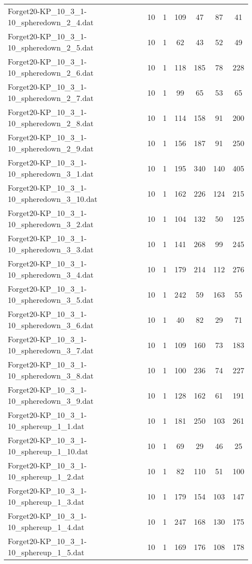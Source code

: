 \begin{table}[!ht]
\begin{tabular}{lcccccc}
Forget20-KP\_10\_3\_1-10\_spheredown\_2\_4.dat & 10 & 1 & 109 & 47 & 87 & 41 \\
Forget20-KP\_10\_3\_1-10\_spheredown\_2\_5.dat & 10 & 1 & 62 & 43 & 52 & 49 \\
Forget20-KP\_10\_3\_1-10\_spheredown\_2\_6.dat & 10 & 1 & 118 & 185 & 78 & 228 \\
Forget20-KP\_10\_3\_1-10\_spheredown\_2\_7.dat & 10 & 1 & 99 & 65 & 53 & 65 \\
Forget20-KP\_10\_3\_1-10\_spheredown\_2\_8.dat & 10 & 1 & 114 & 158 & 91 & 200 \\
Forget20-KP\_10\_3\_1-10\_spheredown\_2\_9.dat & 10 & 1 & 156 & 187 & 91 & 250 \\
Forget20-KP\_10\_3\_1-10\_spheredown\_3\_1.dat & 10 & 1 & 195 & 340 & 140 & 405 \\
Forget20-KP\_10\_3\_1-10\_spheredown\_3\_10.dat & 10 & 1 & 162 & 226 & 124 & 215 \\
Forget20-KP\_10\_3\_1-10\_spheredown\_3\_2.dat & 10 & 1 & 104 & 132 & 50 & 125 \\
Forget20-KP\_10\_3\_1-10\_spheredown\_3\_3.dat & 10 & 1 & 141 & 268 & 99 & 245 \\
Forget20-KP\_10\_3\_1-10\_spheredown\_3\_4.dat & 10 & 1 & 179 & 214 & 112 & 276 \\
Forget20-KP\_10\_3\_1-10\_spheredown\_3\_5.dat & 10 & 1 & 242 & 59 & 163 & 55 \\
Forget20-KP\_10\_3\_1-10\_spheredown\_3\_6.dat & 10 & 1 & 40 & 82 & 29 & 71 \\
Forget20-KP\_10\_3\_1-10\_spheredown\_3\_7.dat & 10 & 1 & 109 & 160 & 73 & 183 \\
Forget20-KP\_10\_3\_1-10\_spheredown\_3\_8.dat & 10 & 1 & 100 & 236 & 74 & 227 \\
Forget20-KP\_10\_3\_1-10\_spheredown\_3\_9.dat & 10 & 1 & 128 & 162 & 61 & 191 \\
Forget20-KP\_10\_3\_1-10\_sphereup\_1\_1.dat & 10 & 1 & 181 & 250 & 103 & 261 \\
Forget20-KP\_10\_3\_1-10\_sphereup\_1\_10.dat & 10 & 1 & 69 & 29 & 46 & 25 \\
Forget20-KP\_10\_3\_1-10\_sphereup\_1\_2.dat & 10 & 1 & 82 & 110 & 51 & 100 \\
Forget20-KP\_10\_3\_1-10\_sphereup\_1\_3.dat & 10 & 1 & 179 & 154 & 103 & 147 \\
Forget20-KP\_10\_3\_1-10\_sphereup\_1\_4.dat & 10 & 1 & 247 & 168 & 130 & 175 \\
Forget20-KP\_10\_3\_1-10\_sphereup\_1\_5.dat & 10 & 1 & 169 & 176 & 108 & 178 \\

\end{tabular}
\end{table}
